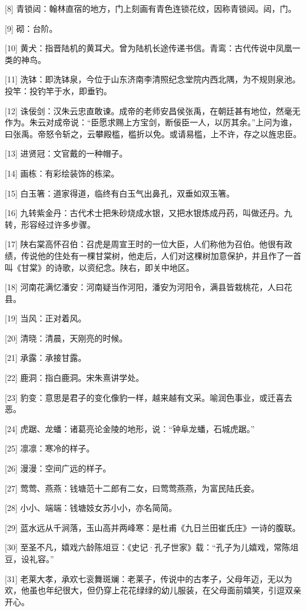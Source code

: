 \documentclass[12pt,UTF8]{ctexbook}
\begin{document}
[8] 青锁闼：翰林直宿的地方，门上刻画有青色连锁花纹，因称青锁闼。闼，门。

[9] 砌：台阶。

[10] 黄犬：指晋陆机的黄耳犬。曾为陆机长途传递书信。青鸾：古代传说中凤凰一类的神鸟。

[11] 洗钵：即洗钵泉，今位于山东济南李清照纪念堂院内西北隅，为不规则泉池。投竿：投钓竿于水，即垂钓。

[12] 诛佞剑：汉朱云忠直敢谏。成帝的老师安昌侯张禹，在朝廷甚有地位，然毫无作为。朱云对成帝说：“臣愿求赐上方宝剑，断佞臣一人，以厉其余。”上问为谁，曰张禹。帝怒令斩之，云攀殿槛，槛折以免。或请易槛，上不许，存之以旌忠臣。

[13] 进贤冠：文官戴的一种帽子。

[14] 画栋：有彩绘装饰的栋梁。

[15] 白玉箸：道家得道，临终有白玉气出鼻孔，双垂如双玉箸。

[16] 九转紫金丹：古代术士把朱砂烧成水银，又把水银炼成丹药，叫做还丹。九转，形容经过许多步骤。

[17] 陕右棠高怀召伯：召虎是周宣王时的一位大臣，人们称他为召伯。他很有政绩，传说他的住处有一棵甘棠树，他走后，人们对这棵树加意保护，并且作了一首叫《甘棠》的诗歌，以资纪念。陕右，即关中地区。

[18] 河南花满忆潘安：河南疑当作河阳，潘安为河阳令，满县皆栽桃花，人曰花县。

[19] 当风：正对着风。

[20] 清晓：清晨，天刚亮的时候。

[21] 承露：承接甘露。

[22] 鹿洞：指白鹿洞。宋朱熹讲学处。

[23] 豹变：意思是君子的变化像豹一样，越来越有文采。喻润色事业，或迁喜去恶。

[24] 虎踞、龙蟠：诸葛亮论金陵的地形，说：“钟阜龙蟠，石城虎踞。”

[25] 凛凛：寒冷的样子。

[26] 漫漫：空间广远的样子。

[27] 莺莺、燕燕：钱塘范十二郎有二女，曰莺莺燕燕，为富民陆氏妾。

[28] 小小、端端：钱塘妓女苏小小，亦名简简。

[29] 蓝水远从千涧落，玉山高并两峰寒：是杜甫《九日兰田崔氏庄》一诗的腹联。

[30] 至圣不凡，嬉戏六龄陈俎豆：《史记·孔子世家》载：“孔子为儿嬉戏，常陈俎豆，设礼容。”

[31] 老莱大孝，承欢七衮舞斑斓：老莱子，传说中的古孝子，父母年迈，无以为欢，他虽也年纪很大，但仍穿上花花绿绿的幼儿服装，在父母面前嬉笑，引逗双亲开心。
\end{document}
